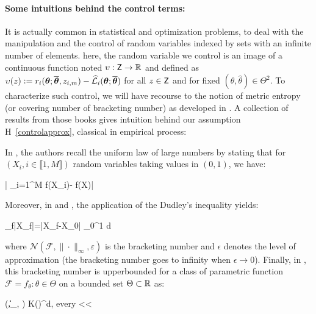 \documentclass[11pt]{article}
\theoremstyle{t}
\begin{document}
\paragraph{Some intuitions behind the control terms:} It is actually common in statistical and optimization problems, to deal with the manipulation and the control of random variables indexed by sets with an infinite number of elements. here, the random variable we control is an image of a continuous function noted $\upsilon: \Zset \to \rset$ and defined as $\upsilon(z) \eqdef r_i (\param ; \op, z_{i,m})  - \sur{i}{\param}{\op}$ for all $z \in \Zset$ and for fixed $(\theta, \hat{\theta}) \in \Theta^2$.
To characterize such control, we will have recourse to the notion of metric entropy (or covering number of bracketing number) as developed in \citep{van2000asymptotic, vershynin2018high, wainwright2019high}.
A collection of results from those books gives intuition behind our assumption H~\ref{controlapprox}, classical in empirical process:

In \citep{vershynin2018high}, the authors recall the uniform law of large numbers by stating that for $(X_i, i \in \llbracket 1, M \rrbracket)$ random variables taking values in $(0,1)$, we have:

\beq
{}\left| \sum_{i=1}^{M} f\left(X_{i}\right)- f(X)\right| \leq {}
\eeq

Moreover, in \citep{vershynin2018high} and \citep{wainwright2019high}, the application of the Dudley's inequality yields:

\beq
{} \sup _{f}\left|X_{f}\right|=\left|X_{f}-X_{0}\right| \leq {} \int_{0}^{1}  d \varepsilon
\eeq

where $\mathcal{N}\left(\mathcal{F},\|\cdot\|_{\infty}, \varepsilon\right)$ is the bracketing number and $\epsilon$ denotes the level of approximation (the bracketing number goes to infinity when $\epsilon  \to 0$). Finally, in \citep{van2000asymptotic}, this bracketing number is upperbounded for a class of parametric function $ \mathcal{F}= {f_{\theta}: \theta \in \Theta}$ on a bounded set $\Theta \subset \rset$ as:


\beq
{}\left(,\|\cdot\|_{\infty}, \varepsilon\right) \leq K\left(\right)^{d}, \quad \textrm{every} <\varepsilon< \Theta
\eeq
\end{document}
